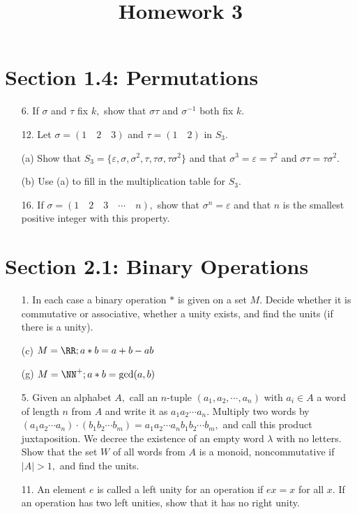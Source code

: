 \documentclass{article}
\begin{document}
\title{Homework 3}
\maketitle
\thispagestyle{fancy}

\section*{Section 1.4: Permutations}
\begin{itemize}
	\item[6.] If $\sigma$ and $\tau$ fix $k,$ show that $\sigma\tau$ and $\sigma^{-1}$ both fix $k.$

	\item[12.] Let $\sigma=(1\quad2\quad3)$ and $\tau=(1\quad2)$ in $S_3.$

		(a) Show that $S_3=\{\varepsilon, \sigma, \sigma^2, \tau, \tau\sigma, \tau\sigma^2\}$ and that $\sigma^3=\varepsilon=\tau^2$ and $\sigma\tau=\tau\sigma^2.$

		(b) Use (a) to fill in the multiplication table for $S_3.$

	\item[16.] If $\sigma=(1\quad2\quad3\quad\cdots\quad n),$ show that $\sigma^n=\varepsilon$ and that $n$ is the smallest positive integer with this property.
		
\end{itemize}

\section*{Section 2.1: Binary Operations}
\begin{itemize}
	\item[1.] In each case a binary operation $*$ is given on a set $M.$ Decide whether it is commutative or associative, whether a unity exists, and find the units (if there is a unity).

		(c) $M=\RR; a*b=a+b-ab$

		(g) $M=\NN^+; a*b=\gcd(a, b)$

	\item[5.] Given an alphabet $A,$ call an $n$-tuple $(a_1, a_2, \cdots, a_n)$ with $a_i\in A$ a word of length $n$ from $A$ and write it as $a_1a_2\cdots a_n.$ Multiply two words by $(a_1a_2\cdots a_n)\cdot(b_1b_2\cdots b_m)=a_1a_2\cdots a_n b_1b_2\cdots b_m,$ and call this product juxtaposition. We decree the existence of an empty word $\lambda$ with no letters. Show that the set $W$ of all words from $A$ is a monoid, noncommutative if $\vert A\vert>1,$ and find the units.

	\item[11.] An element $e$ is called a left unity for an operation if $ex=x$ for all $x.$ If an operation has two left unities, show that it has no right unity.
		
\end{itemize}
\end{document}
